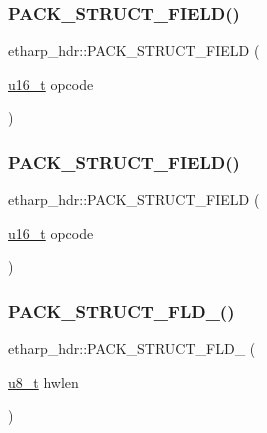 \subsubsection{\texorpdfstring{P\+A\+C\+K\+\_\+\+S\+T\+R\+U\+C\+T\+\_\+\+F\+I\+E\+L\+D()}{PACK\_STRUCT\_FIELD()}\hspace{0.1cm}{\footnotesize\ttfamily [5/6]}}
{\footnotesize\ttfamily etharp\+\_\+hdr\+::\+P\+A\+C\+K\+\_\+\+S\+T\+R\+U\+C\+T\+\_\+\+F\+I\+E\+LD (\begin{DoxyParamCaption}\item[{\hyperlink{group__compiler__abstraction_ga77570ac4fcab86864fa1916e55676da2}{u16\+\_\+t}}]{opcode }\end{DoxyParamCaption})}

\mbox{\label{structetharp__hdr_a3b20d36ae72daac8189ced51d1be27cf}} 
\subsubsection{\texorpdfstring{P\+A\+C\+K\+\_\+\+S\+T\+R\+U\+C\+T\+\_\+\+F\+I\+E\+L\+D()}{PACK\_STRUCT\_FIELD()}\hspace{0.1cm}{\footnotesize\ttfamily [6/6]}}
{\footnotesize\ttfamily etharp\+\_\+hdr\+::\+P\+A\+C\+K\+\_\+\+S\+T\+R\+U\+C\+T\+\_\+\+F\+I\+E\+LD (\begin{DoxyParamCaption}\item[{\hyperlink{group__compiler__abstraction_ga77570ac4fcab86864fa1916e55676da2}{u16\+\_\+t}}]{opcode }\end{DoxyParamCaption})}

\mbox{\label{structetharp__hdr_a1b4df95761337606835bc21163ea6929}} 
\subsubsection{\texorpdfstring{P\+A\+C\+K\+\_\+\+S\+T\+R\+U\+C\+T\+\_\+\+F\+L\+D\+\_()}{PACK\_STRUCT\_FLD\_8()}\hspace{0.1cm}{\footnotesize\ttfamily [1/4]}}
{\footnotesize\ttfamily etharp\+\_\+hdr\+::\+P\+A\+C\+K\+\_\+\+S\+T\+R\+U\+C\+T\+\_\+\+F\+L\+D\+\_ (\begin{DoxyParamCaption}\item[{\hyperlink{group__compiler__abstraction_ga4caecabca98b43919dd11be1c0d4cd8e}{u8\+\_\+t}}]{hwlen }\end{DoxyParamCaption})}

